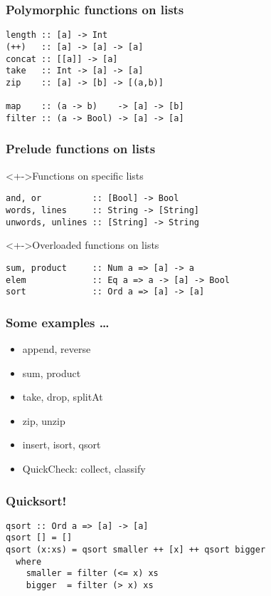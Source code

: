 \documentclass{beamer}
\begin{document}
\begin{frame}[fragile]
  \frametitle{Polymorphic functions on lists}
\begin{verbatim}
length :: [a] -> Int
(++)   :: [a] -> [a] -> [a]
concat :: [[a]] -> [a]
take   :: Int -> [a] -> [a]
zip    :: [a] -> [b] -> [(a,b)]

map    :: (a -> b)    -> [a] -> [b]
filter :: (a -> Bool) -> [a] -> [a]
\end{verbatim}
\end{frame}
\begin{frame}[fragile]
  \frametitle{Prelude functions on lists}
  \begin{block}<+->{Functions on specific lists}
\begin{verbatim}
and, or          :: [Bool] -> Bool
words, lines     :: String -> [String]
unwords, unlines :: [String] -> String
\end{verbatim}
  \end{block}
  \begin{block}<+->{Overloaded functions on lists}
\begin{verbatim}
sum, product     :: Num a => [a] -> a
elem             :: Eq a => a -> [a] -> Bool
sort             :: Ord a => [a] -> [a]
\end{verbatim}
  \end{block}
\end{frame}
\begin{frame}[fragile]
  \frametitle{Some examples \dots}
  \begin{itemize}
  \item append, reverse
  \item sum, product
  \item take, drop, splitAt
  \item zip, unzip
  \item insert, isort, qsort
  \item QuickCheck: collect, classify
  \end{itemize}
\end{frame}
\begin{frame}[fragile]
  \frametitle{Quicksort!}
\begin{verbatim}
qsort :: Ord a => [a] -> [a]
qsort [] = []
qsort (x:xs) = qsort smaller ++ [x] ++ qsort bigger
  where
    smaller = filter (<= x) xs
    bigger  = filter (> x) xs
\end{verbatim}
\end{frame}
\end{document}
